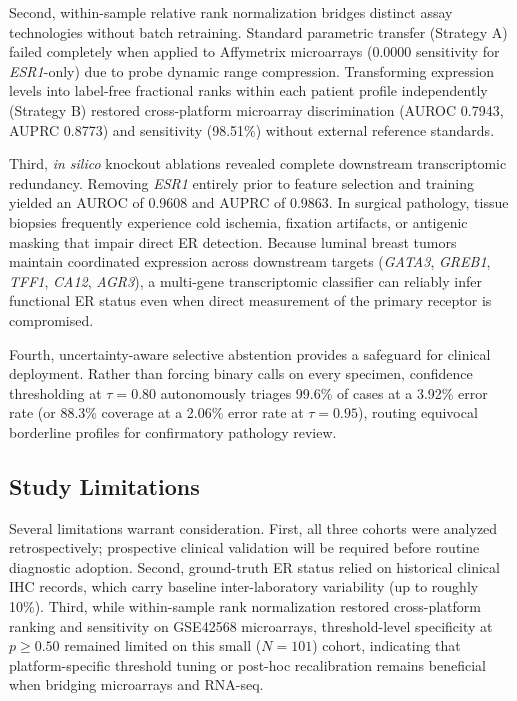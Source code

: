 \documentclass[11pt,a4paper]{article}
\begin{document}
Second, within-sample relative rank normalization bridges distinct assay technologies without batch retraining. Standard parametric transfer (Strategy A) failed completely when applied to Affymetrix microarrays (0.0000 sensitivity for \textit{ESR1}-only) due to probe dynamic range compression. Transforming expression levels into label-free fractional ranks within each patient profile independently (Strategy B) restored cross-platform microarray discrimination (AUROC 0.7943, AUPRC 0.8773) and sensitivity (98.51\%) without external reference standards.

Third, \textit{in silico} knockout ablations revealed complete downstream transcriptomic redundancy. Removing \textit{ESR1} entirely prior to feature selection and training yielded an AUROC of 0.9608 and AUPRC of 0.9863. In surgical pathology, tissue biopsies frequently experience cold ischemia, fixation artifacts, or antigenic masking that impair direct ER detection. Because luminal breast tumors maintain coordinated expression across downstream targets (\textit{GATA3}, \textit{GREB1}, \textit{TFF1}, \textit{CA12}, \textit{AGR3}), a multi-gene transcriptomic classifier can reliably infer functional ER status even when direct measurement of the primary receptor is compromised.

Fourth, uncertainty-aware selective abstention provides a safeguard for clinical deployment. Rather than forcing binary calls on every specimen, confidence thresholding at $\tau = 0.80$ autonomously triages 99.6\% of cases at a 3.92\% error rate (or 88.3\% coverage at a 2.06\% error rate at $\tau = 0.95$), routing equivocal borderline profiles for confirmatory pathology review.

\subsection{Study Limitations}
Several limitations warrant consideration. First, all three cohorts were analyzed retrospectively; prospective clinical validation will be required before routine diagnostic adoption. Second, ground-truth ER status relied on historical clinical IHC records, which carry baseline inter-laboratory variability (up to roughly 10\%). Third, while within-sample rank normalization restored cross-platform ranking and sensitivity on GSE42568 microarrays, threshold-level specificity at $p \ge 0.50$ remained limited on this small ($N = 101$) cohort, indicating that platform-specific threshold tuning or post-hoc recalibration remains beneficial when bridging microarrays and RNA-seq.
\end{document}
